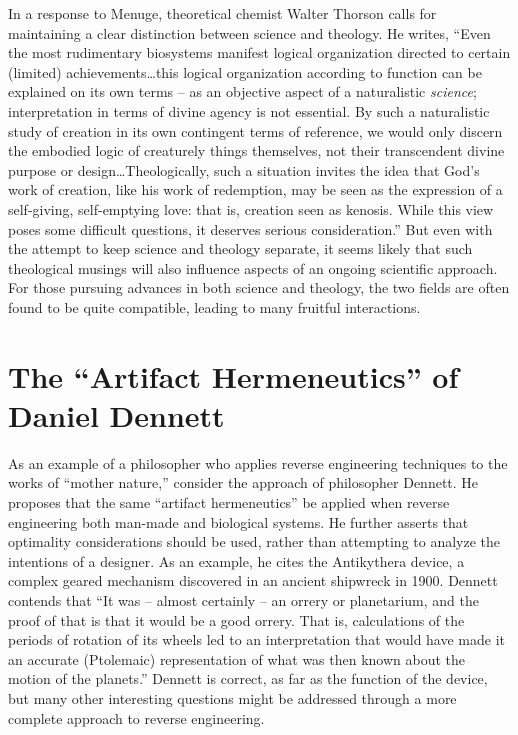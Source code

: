 In a response to Menuge, theoretical chemist Walter Thorson calls for
maintaining a clear distinction between science and theology. He
writes, “Even the most rudimentary biosystems manifest logical
organization directed to certain (limited) achievements…this logical
organization according to function can be explained on its own terms –
as an objective aspect of a naturalistic \textit{science};
interpretation in terms of divine agency is not essential. By such a
naturalistic study of creation in its own contingent terms of
reference, we would only discern the embodied logic of creaturely
things themselves, not their transcendent divine purpose or
design…Theologically, such a situation invites the idea that God’s work
of creation, like his work of redemption, may be seen as the expression
of a self-giving, self-emptying love: that is, creation seen as
kenosis. While this view poses some difficult questions, it deserves
serious consideration.”\citep[][pg. 101]{thorson2003} But even with the attempt
to keep science and theology separate, it seems likely that such
theological musings will also influence aspects of an ongoing
scientific approach. For those pursuing advances in both science and
theology, the two fields are often found to be quite compatible,
leading to many fruitful interactions.

\section{The “Artifact Hermeneutics” of Daniel Dennett}

As an example of a philosopher who applies reverse engineering
techniques to the works of “mother nature,” consider the approach of
philosopher Dennett. He proposes that the same “artifact hermeneutics”
be applied when reverse engineering both man-made and biological
systems.\citep[][pg. 177]{dennett1990} He further asserts that optimality
considerations should be used, rather than attempting to analyze the
intentions of a designer. As an example, he cites the Antikythera
device, a complex geared mechanism discovered in an ancient shipwreck
in 1900. Dennett contends that “It was – almost certainly – an orrery
or planetarium, and the proof of that is that it would be a good
orrery. That is, calculations of the periods of rotation of its wheels
led to an interpretation that would have made it an accurate
(Ptolemaic) representation of what was then known about the motion of
the planets.”\citep[][pg. 180]{dennett1990} Dennett is correct, as far as the
function of the device, but many other interesting questions might be
addressed through a more complete approach to reverse engineering.

